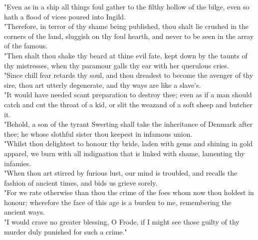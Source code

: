 \documentclass[10pt,a4paper]{report}
\begin{document}
"Even as in a ship all things foul gather to the filthy hollow of the bilge, even so hath a flood of vices poured into Ingild.\\

"Therefore, in terror of thy shame being published, thou shalt lie crushed in the corners of the land, sluggish on thy foul hearth, and never to be seen in the array of the famous.\\

"Then shalt thou shake thy beard at thine evil fate, kept down by the taunts of thy mistresses, when thy paramour galls thy ear with her querulous cries.\\

"Since chill fear retards thy soul, and thou dreadest to become the avenger of thy sire, thou art utterly degenerate, and thy ways are like a slave's.\\

"It would have needed scant preparation to destroy thee; even as if a man should catch and cut the throat of a kid, or slit the weazand of a soft sheep and butcher it.\\

"Behold, a son of the tyrant Swerting shall take the inheritance of Denmark after thee; he whose slothful sister thou keepest in infamous union.\\

"Whilst thou delightest to honour thy bride, laden with gems and shining in gold apparel, we burn with all indignation that is linked with shame, lamenting thy infamies.\\

"When thou art stirred by furious lust, our mind is troubled, and recalls the fashion of ancient times, and bids us grieve sorely.\\

"For we rate otherwise than thou the crime of the foes whom now thou holdest in honour; wherefore the face of this age is a burden to me, remembering the ancient ways.\\

"I would crave no greater blessing, O Frode, if I might see those guilty of thy murder duly punished for such a crime."\\
\end{document}
